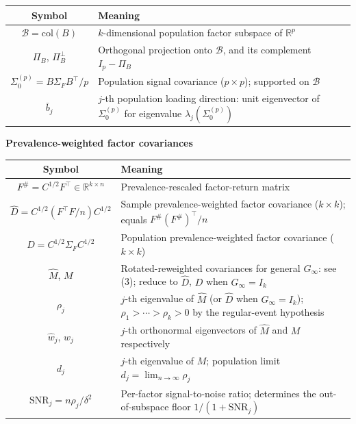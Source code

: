 \documentclass{article}
\theoremstyle{remark}
\begin{document}
\begin{center}
\begin{tabular}{|c|l|}
\hline
Symbol & Meaning \\
\hline
$\mathcal{B} = \mathrm{col}(B)$ & $k$-dimensional population factor subspace of $\mathbb{R}^p$ \\
\hline
$\Pi_B$, $\Pi_B^\perp$ & Orthogonal projection onto $\mathcal{B}$, and its complement $I_p - \Pi_B$ \\
\hline
$\Sigma_0^{(p)} = B\Sigma_F B^\top/p$ & Population signal covariance ($p\times p$); supported on $\mathcal{B}$ \\
\hline
$\bar{b}_j$ & $j$-th population loading direction: unit eigenvector of $\Sigma_0^{(p)}$ for eigenvalue $\lambda_j(\Sigma_0^{(p)})$ \\
\hline
\end{tabular}
\end{center}

\textbf{Prevalence-weighted factor covariances}

\begin{center}
\begin{tabular}{|c|l|}
\hline
Symbol & Meaning \\
\hline
$F^\# = C^{1/2}F^\top \in \mathbb{R}^{k\times n}$ & Prevalence-rescaled factor-return matrix \\
\hline
$\hat{D} = C^{1/2}(F^\top F/n)C^{1/2}$ & Sample prevalence-weighted factor covariance ($k\times k$); equals $F^\#(F^\#)^\top/n$ \\
\hline
$D = C^{1/2}\Sigma_F C^{1/2}$ & Population prevalence-weighted factor covariance ($k\times k$) \\
\hline
$\hat{M}$, $M$ & Rotated-reweighted covariances for general $G_\infty$: see (3); reduce to $\hat{D}$, $D$ when $G_\infty = I_k$ \\
\hline
$\rho_j$ & $j$-th eigenvalue of $\hat{M}$ (or $\hat{D}$ when $G_\infty=I_k$); $\rho_1>\cdots>\rho_k>0$ by the regular-event hypothesis \\
\hline
$\hat{w}_j$, $w_j$ & $j$-th orthonormal eigenvectors of $\hat{M}$ and $M$ respectively \\
\hline
$d_j$ & $j$-th eigenvalue of $M$; population limit $d_j = \lim_{n\to\infty}\rho_j$ \\
\hline
$\mathrm{SNR}_j = n\rho_j/\delta^2$ & Per-factor signal-to-noise ratio; determines the out-of-subspace floor $1/(1+\mathrm{SNR}_j)$ \\
\hline
\end{tabular}
\end{center}
\end{document}
